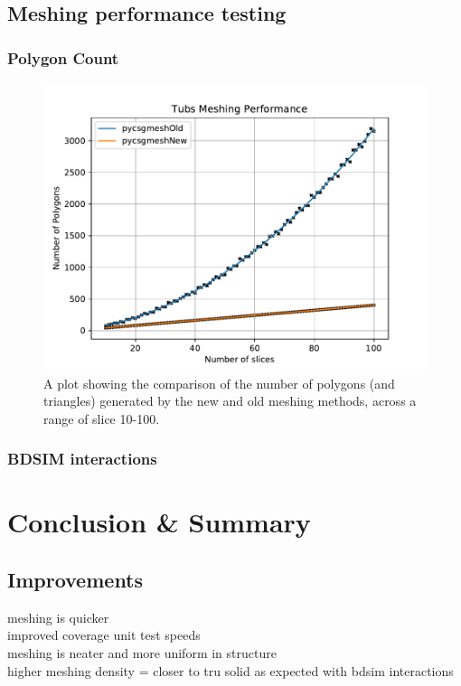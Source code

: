 \documentclass[12pt,a4paper]{article}
\begin{document}
\subsection{Meshing performance testing}
\subsubsection{Polygon Count}

\begin{figure}[h!]
\centering
\includegraphics[scale=0.6]{Images//Quad_fits//Tubs_quad.pdf}
\caption[width=\columnwidth]{A plot showing the comparison of the number of polygons (and triangles) generated by the new and old meshing methods, across a range of slice 10-100.}
\label{conts}
\end{figure}
\subsubsection{BDSIM interactions}

\newpage
\section{Conclusion \& Summary}
\label{conc}
\subsection{Improvements}
meshing is quicker\\
improved coverage unit test speeds\\
meshing is neater and more uniform in structure\\
higher meshing density = closer to tru solid as expected with bdsim interactions\\
\end{document}
